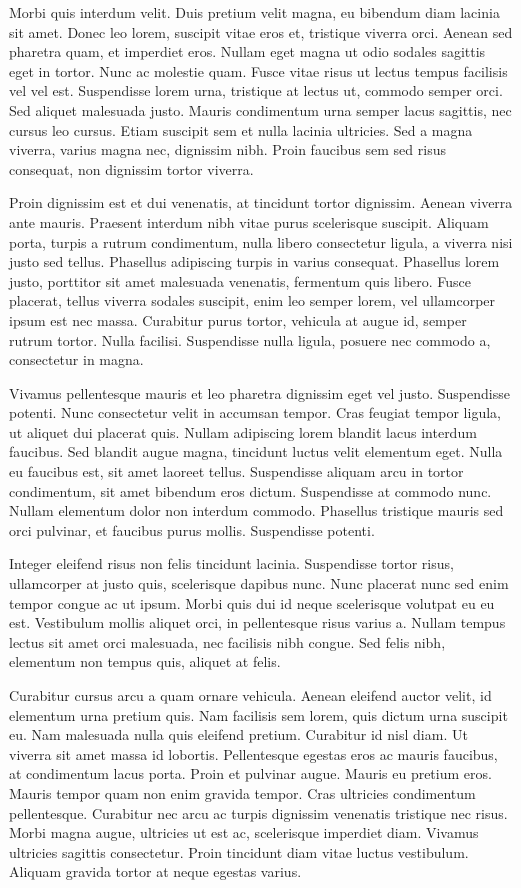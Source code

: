 \documentclass{scrartcl}
\begin{document}
Morbi quis interdum velit. Duis pretium velit magna, eu bibendum diam lacinia sit amet. Donec leo lorem, suscipit vitae eros et, tristique viverra orci. Aenean sed pharetra quam, et imperdiet eros. Nullam eget magna ut odio sodales sagittis eget in tortor. Nunc ac molestie quam. Fusce vitae risus ut lectus tempus facilisis vel vel est. Suspendisse lorem urna, tristique at lectus ut, commodo semper orci. Sed aliquet malesuada justo. Mauris condimentum urna semper lacus sagittis, nec cursus leo cursus. Etiam suscipit sem et nulla lacinia ultricies. Sed a magna viverra, varius magna nec, dignissim nibh. Proin faucibus sem sed risus consequat, non dignissim tortor viverra.

Proin dignissim est et dui venenatis, at tincidunt tortor dignissim. Aenean viverra ante mauris. Praesent interdum nibh vitae purus scelerisque suscipit. Aliquam porta, turpis a rutrum condimentum, nulla libero consectetur ligula, a viverra nisi justo sed tellus. Phasellus adipiscing turpis in varius consequat. Phasellus lorem justo, porttitor sit amet malesuada venenatis, fermentum quis libero. Fusce placerat, tellus viverra sodales suscipit, enim leo semper lorem, vel ullamcorper ipsum est nec massa. Curabitur purus tortor, vehicula at augue id, semper rutrum tortor. Nulla facilisi. Suspendisse nulla ligula, posuere nec commodo a, consectetur in magna.

Vivamus pellentesque mauris et leo pharetra dignissim eget vel justo. Suspendisse potenti. Nunc consectetur velit in accumsan tempor. Cras feugiat tempor ligula, ut aliquet dui placerat quis. Nullam adipiscing lorem blandit lacus interdum faucibus. Sed blandit augue magna, tincidunt luctus velit elementum eget. Nulla eu faucibus est, sit amet laoreet tellus. Suspendisse aliquam arcu in tortor condimentum, sit amet bibendum eros dictum. Suspendisse at commodo nunc. Nullam elementum dolor non interdum commodo. Phasellus tristique mauris sed orci pulvinar, et faucibus purus mollis. Suspendisse potenti.

Integer eleifend risus non felis tincidunt lacinia. Suspendisse tortor risus, ullamcorper at justo quis, scelerisque dapibus nunc. Nunc placerat nunc sed enim tempor congue ac ut ipsum. Morbi quis dui id neque scelerisque volutpat eu eu est. Vestibulum mollis aliquet orci, in pellentesque risus varius a. Nullam tempus lectus sit amet orci malesuada, nec facilisis nibh congue. Sed felis nibh, elementum non tempus quis, aliquet at felis.

Curabitur cursus arcu a quam ornare vehicula. Aenean eleifend auctor velit, id elementum urna pretium quis. Nam facilisis sem lorem, quis dictum urna suscipit eu. Nam malesuada nulla quis eleifend pretium. Curabitur id nisl diam. Ut viverra sit amet massa id lobortis. Pellentesque egestas eros ac mauris faucibus, at condimentum lacus porta. Proin et pulvinar augue. Mauris eu pretium eros. Mauris tempor quam non enim gravida tempor. Cras ultricies condimentum pellentesque. Curabitur nec arcu ac turpis dignissim venenatis tristique nec risus. Morbi magna augue, ultricies ut est ac, scelerisque imperdiet diam. Vivamus ultricies sagittis consectetur. Proin tincidunt diam vitae luctus vestibulum. Aliquam gravida tortor at neque egestas varius.
\end{document}
